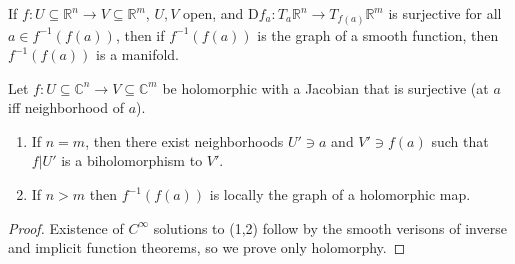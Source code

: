 
\begin{theorem}\label{1.1.36}
If $f : U\subseteq \mathbb{R} ^n \to V\subseteq \mathbb{R} ^m$, $U,V$ open, and $\mathrm{D} f_a : T_a\mathbb{R} ^n \to T_{f(a)} \mathbb{R} ^m$ is surjective for all $a\in f^{-1} (f(a))$, then if $f^{-1} (f(a))$ is the graph of a smooth function, then $f^{-1} (f(a))$ is a manifold.
\end{theorem}

\begin{theorem}\label{1.1.37}
	Let $f : U\subseteq \mathbb{C} ^n \to V\subseteq \mathbb{C} ^m$ be holomorphic with a Jacobian that is surjective (at $a$ iff neighborhood of $a$).
	\begin{enumerate}
		\item If $n=m$, then there exist neighborhoods $U'\ni a$ and $V'\ni f(a)$ such that $f|U'$ is a biholomorphism to $V'$.
		\item If $n>m$ then $f^{-1} (f(a))$ is locally the graph of a holomorphic map.
	\end{enumerate}
\end{theorem}
\begin{proof}
	Existence of $C^\infty $ solutions to (1,2) follow by the smooth verisons of inverse and implicit function theorems, so we prove only holomorphy.
\end{proof}

